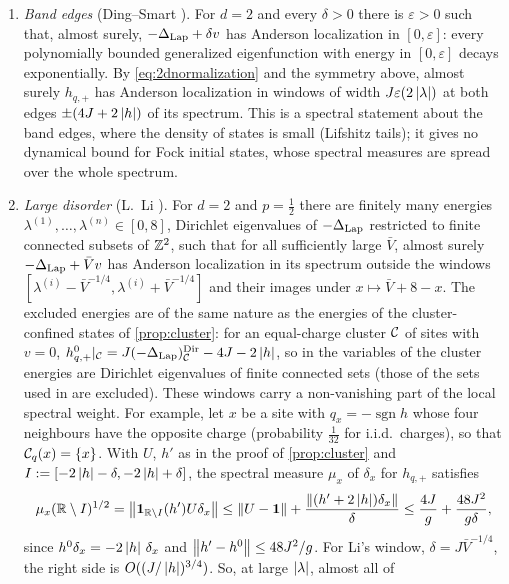 \begin{enumerate}[label=(\arabic*)]
\item \emph{Band edges} (Ding--Smart \cite[Thm.~1.1]{DingSmart2020}).  For $d=2$ and every $\delta>0$ there is
$\varepsilon>0$ such that, almost surely, $-\Delta_{\rm Lap}+\delta v$ has Anderson localization in $[0,\varepsilon]$:
every polynomially bounded generalized eigenfunction with energy in $[0,\varepsilon]$ decays exponentially.  By
\eqref{eq:2dnormalization} and the symmetry above, almost surely $h_{q,+}$ has Anderson localization in windows of
width $J\varepsilon(2\left|\lambda\right|)$ at both edges $\pm(4J+2\left|h\right|)$ of its spectrum.  This is a spectral statement
about the band edges, where the density of states is small (Lifshitz tails); it gives no dynamical bound for Fock
initial states, whose spectral measures are spread over the whole spectrum.
\item \emph{Large disorder} (L.~Li \cite[Thm.~1.1]{LiL2022}).  For $d=2$ and $p=\frac12$ there are finitely many
energies $\lambda^{(1)},\dots,\lambda^{(n)}\in[0,8]$, Dirichlet eigenvalues of $-\Delta_{\rm Lap}$ restricted to finite
connected subsets of $\mathbb{Z}^2$, such that for all sufficiently large $\bar V$, almost surely $-\Delta_{\rm Lap}+\bar Vv$
has Anderson localization in its spectrum outside the windows $[\lambda^{(i)}-\bar V^{-1/4},\lambda^{(i)}+\bar V^{-1/4}]$
and their images under $x\mapsto\bar V+8-x$.  The excluded energies are of the same nature as the energies of the
cluster-confined states of \cref{prop:cluster}: for an equal-charge cluster $\mathcal{C}$ of sites with $v=0$,
$h^0_{q,+}|_{\mathcal{C}}=J(-\Delta_{\rm Lap})^{\rm Dir}_{\mathcal{C}}-4J-2\left|h\right|$, so in the variables of \cite{LiL2022} the cluster
energies are Dirichlet eigenvalues of finite connected sets (those of the sets used in \cite[Def.~2.12]{LiL2022}
are excluded).  These windows carry a non-vanishing part of the local spectral weight.  For example, let $x$ be a
site with $q_x=-\operatorname{sgn}h$ whose four neighbours have the opposite charge (probability $\frac1{32}$ for
i.i.d.\ charges), so that $\mathcal{C}_q(x)=\{x\}$.  With $U$, $h'$ as in the proof of
\cref{prop:cluster} and $I:=[-2\left|h\right|-\delta,-2\left|h\right|+\delta]$, the spectral measure $\mu_x$ of $\delta_x$ for $h_{q,+}$
satisfies
\[
  \mu_x(\mathbb{R}\setminus I)^{1/2}=\left\|\mathbf{1}_{\mathbb{R}\setminus I}(h')U\delta_x\right\|\le\left\|U-\mathbf{1}\right\|+\frac{\left\|(h'+2\left|h\right|)\delta_x\right\|}\delta
  \le\frac{4J}g+\frac{48J^2}{g\delta},
\]
since $h^0\delta_x=-2\left|h\right|\,\delta_x$ and $\left\|h'-h^0\right\|\le48J^2/g$.  For Li's window,
$\delta=J\bar V^{-1/4}$, the right side is $O((J/\left|h\right|)^{3/4})$.  So, at large $\left|\lambda\right|$, almost all of

\end{enumerate}
